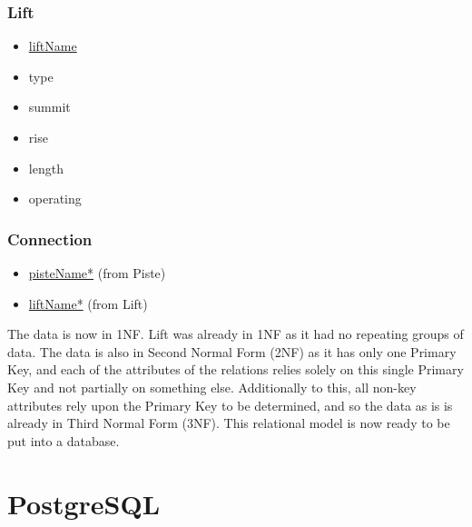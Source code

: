 \documentclass[11pt]{scrartcl} %
\newenvironment{myitemize}
{ \begin{itemize}[]
    \setlength{\itemsep}{0pt}
    \setlength{\parskip}{0pt}
    \setlength{\parsep}{0pt}     }
{ \end{itemize}                  }
\begin{document}
\subsubsection{Lift}
\begin{myitemize}
\item\underline{liftName}
\item type
\item summit
\item rise
\item length
\item operating
\end{myitemize}
\subsubsection{Connection}
\begin{myitemize}
\item \underline{pisteName*} (from Piste)
\item \underline{liftName*} (from Lift)
\end{myitemize}

The data is now in 1NF. Lift was already in 1NF as it had no repeating groups of data. The data is also in Second Normal Form (2NF) as it has only one Primary Key, and each of the attributes of the relations relies solely on this single Primary Key and not partially on something else. Additionally to this, all non-key attributes rely upon the Primary Key to be determined, and so the data as is is already in Third Normal Form (3NF). This relational model is now ready to be put into a database.
\section{PostgreSQL}
\end{document}
